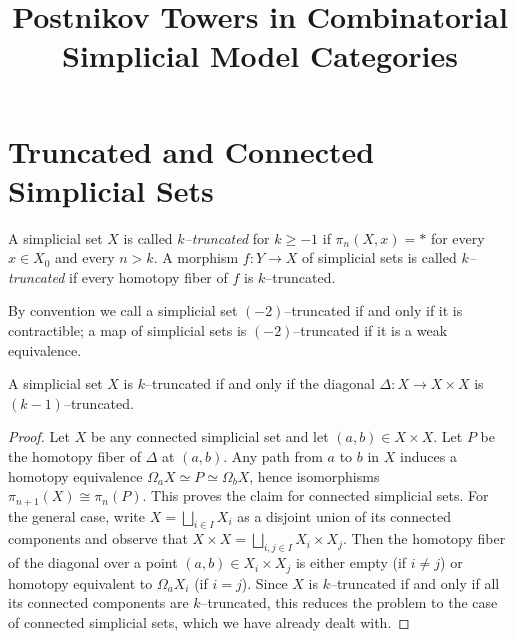 




\title{Postnikov Towers in Combinatorial Simplicial Model Categories}
\date{}
\maketitle

{\footnotesize
\tableofcontents
}

\section{Truncated and Connected Simplicial Sets}

\begin{definition}\label{defn:truncated_simp}
  A simplicial set \(X\) is called \emph{\(k\)--truncated} for
  \(k\geq-1\) if \(\pi_{n}(X,x) = *\) for every \(x\in X_{0}\) and
  every \(n>k\). A morphism \(f\colon Y\to X\) of simplicial sets is
  called \emph{\(k\)--truncated} if every homotopy fiber of \(f\)
  is \(k\)--truncated.
\end{definition}

By convention we call a simplicial set \((-2)\)--truncated
if and only if it is contractible; a map of simplicial sets is
\((-2)\)--truncated if it is a weak equivalence.

\begin{lemma}\label{lem:truncated-diagonal}
  A simplicial set \(X\) is \(k\)--truncated if and only if the
  diagonal \(\Delta\colon X\to X\times X\) is \((k-1)\)--truncated.
\end{lemma}
\begin{proof}
  Let \(X\) be any connected simplicial set and let \((a,b)\in X\times
  X\). Let \(P\) be the homotopy fiber of \(\Delta\) at \((a,b)\).
  Any path from \(a\) to \(b\) in \(X\) induces a homotopy equivalence
  \(\Omega_{a}X \simeq P \simeq \Omega_{b} X\), hence isomorphisms
  \(\pi_{n+1}(X)\cong \pi_{n}(P)\). This proves the claim for
  connected simplicial sets. For the general case, write \(X =
  \bigsqcup_{i\in I} X_{i}\) as a disjoint union of its connected
  components and observe that \(X\times X = \bigsqcup_{i,j\in I}
  X_{i}\times X_{j}\). Then the homotopy fiber of the diagonal over a
  point \((a,b)\in X_{i}\times X_{j}\) is either empty (if \(i\neq
  j\)) or homotopy equivalent to \(\Omega_{a}X_{i}\) (if \(i =
  j\)). Since \(X\) is \(k\)--truncated if and only if all its
  connected components are \(k\)--truncated, this reduces the problem
  to the case of connected simplicial sets, which we have already
  dealt with.

\end{proof}

